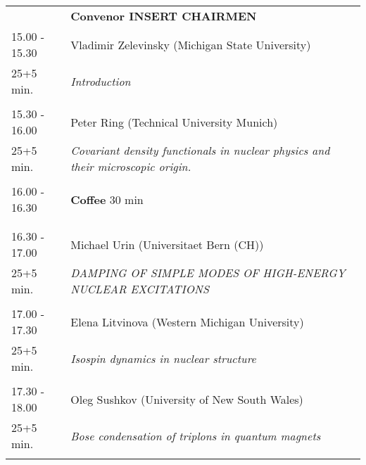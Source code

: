 \begin{longtable}{p{3cm}p{13cm}}
&\hfill {\bf Convenor INSERT CHAIRMEN }\\ 
15.00 - 15.30 & Vladimir Zelevinsky (Michigan State University)\\ 
25+5 min. & {\it Introduction}\\ 
 & \\ 
15.30 - 16.00 & Peter Ring (Technical University Munich)\\ 
25+5 min. & {\it Covariant density functionals in nuclear physics and their microscopic origin.}\\ 
 & \\ 
16.00 - 16.30 & {\bf Coffee} \hfill 30 min \\ 
 & \\ 
 & \\ 
16.30 - 17.00 & Michael Urin (Universitaet Bern (CH))\\ 
25+5 min. & {\it DAMPING OF SIMPLE MODES OF HIGH-ENERGY NUCLEAR EXCITATIONS}\\ 
 & \\ 
17.00 - 17.30 & Elena Litvinova (Western Michigan University)\\ 
25+5 min. & {\it Isospin dynamics in nuclear structure}\\ 
 & \\ 
17.30 - 18.00 & Oleg Sushkov (University of New South Wales)\\ 
25+5 min. & {\it Bose condensation of triplons in quantum magnets}\\ 
 & \\ 
\end{longtable}

